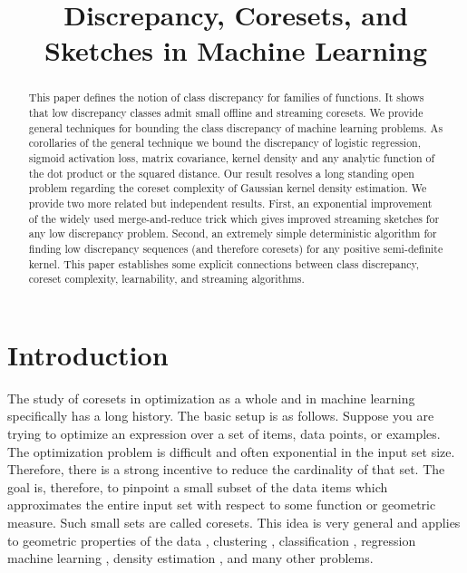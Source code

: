 \documentclass[anon,12pt]{colt2019} %
\title[Discrepancy, Coresets, and Sketches in Machine Learning]{Discrepancy, Coresets, and Sketches in Machine Learning}
\begin{document}
\maketitle

\begin{abstract}
This paper defines the notion of class discrepancy for families of functions.  It shows that low discrepancy classes admit small offline and streaming coresets. We provide general techniques for bounding the class discrepancy of machine learning problems. 
As corollaries of the general technique we bound the discrepancy of logistic regression, sigmoid activation loss, matrix covariance, kernel density and any analytic function of the dot product or the squared distance.
Our result resolves a long standing open problem regarding the coreset complexity of Gaussian kernel density estimation.  
We provide two more related but independent results. 
First, an exponential improvement of the widely used merge-and-reduce trick which gives improved streaming sketches for any low discrepancy problem.
Second, an extremely simple deterministic algorithm for finding low discrepancy sequences (and therefore coresets) for any positive semi-definite kernel. 
This paper establishes some explicit connections between class discrepancy, coreset complexity, learnability, and streaming algorithms. 
\end{abstract}


\section{Introduction}
The study of coresets in optimization as a whole and in machine learning specifically has a long history. 
The basic setup is as follows.
Suppose you are trying to optimize an expression over a set of items, data points, or examples.
The optimization problem is difficult and often exponential in the input set size.
Therefore, there is a strong incentive to reduce the cardinality of that set. 
The goal is, therefore, to pinpoint a small subset of the data items which approximates the entire input set with respect to some function or geometric measure. Such small sets are called coresets. 
This idea is very general and applies to geometric properties of the data \cite{agarwal2005geometric}, 
clustering \cite{DBLP:conf/compgeom/Har-PeledK05} \cite{DBLP:conf/stoc/FeldmanL11}, classification \cite{DBLP:conf/ijcai/Har-PeledRZ07}, regression \cite{DBLP:conf/nips/MunteanuSSW18} 
machine learning \cite{bachem2017practical}, density estimation \cite{DBLP:journals/corr/abs-1802-01751}, and many other problems. 
\end{document}

